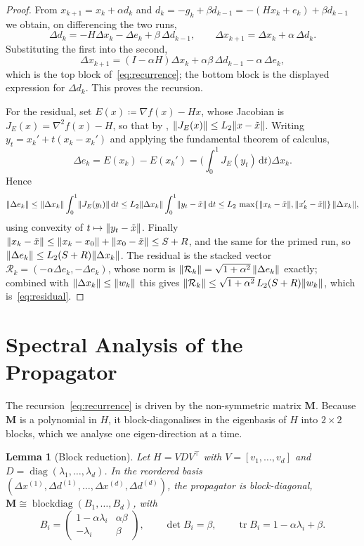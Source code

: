 \documentclass[11pt]{article}
\theoremstyle{plain}
\newtheorem{lemma}{Lemma}[section]
\theoremstyle{definition}
\theoremstyle{remark}
\DeclarePairedDelimiter{\norm}{\lVert}{\rVert}
\renewcommand{\d}{\mathrm{d}}
\DeclareMathOperator{\tr}{tr}
\DeclareMathOperator{\diag}{diag}
\DeclareMathOperator{\blockdiag}{blockdiag}
\newcommand{\grad}{\nabla}
\newcommand{\Hess}{\nabla^2}
\newcommand{\Mmat}{\mathbf{M}}
\newcommand{\xt}{\tilde{x}}
\begin{document}
\begin{proof}
From $x_{k+1}=x_{k}+\alpha d_{k}$ and
$d_{k}=-g_{k}+\beta d_{k-1}=-(Hx_{k}+e_{k})+\beta d_{k-1}$ we obtain, on
differencing the two runs,
\[
  \Delta d_{k}=-H\Delta x_{k}-\Delta e_{k}+\beta\,\Delta d_{k-1},
  \qquad
  \Delta x_{k+1}=\Delta x_{k}+\alpha\,\Delta d_{k}.
\]
Substituting the first into the second,
\[
  \Delta x_{k+1}
  =(I-\alpha H)\Delta x_{k}+\alpha\beta\,\Delta d_{k-1}-\alpha\,\Delta e_{k},
\]
which is the top block of~\eqref{eq:recurrence}; the bottom block is the
displayed expression for $\Delta d_{k}$. This proves the recursion.
 
For the residual, set $E(x)\coloneqq\grad f(x)-Hx$, whose Jacobian is
$J_{E}(x)=\Hess f(x)-H$, so that by ,
$\norm{J_{E}(x)}\le L_{2}\norm{x-\xt}$. Writing
$y_{t}=x_{k}'+t(x_{k}-x_{k}')$ and applying the fundamental theorem of
calculus,
\[
  \Delta e_{k}=E(x_{k})-E(x_{k}')
  =\Big(\int_{0}^{1}J_{E}(y_{t})\,\d t\Big)\Delta x_{k}.
\]
Hence
\[
  \norm{\Delta e_{k}}
  \le\norm{\Delta x_{k}}\int_{0}^{1}\norm{J_{E}(y_{t})}\,\d t
  \le L_{2}\norm{\Delta x_{k}}\int_{0}^{1}\norm{y_{t}-\xt}\,\d t
  \le L_{2}\,\max\{\norm{x_{k}-\xt},\norm{x_{k}'-\xt}\}\,\norm{\Delta x_{k}},
\]
using convexity of $t\mapsto\norm{y_{t}-\xt}$. Finally
$\norm{x_{k}-\xt}\le\norm{x_{k}-x_{0}}+\norm{x_{0}-\xt}\le S+R$, and the
same for the primed run, so
$\norm{\Delta e_{k}}\le L_{2}(S+R)\norm{\Delta x_{k}}$. The residual is
the stacked vector $\mathcal{R}_{k}=(-\alpha\Delta e_{k},-\Delta e_{k})$,
whose norm is $\norm{\mathcal{R}_{k}}=\sqrt{1+\alpha^{2}}\,\norm{\Delta e_{k}}$
exactly; combined with $\norm{\Delta x_{k}}\le\norm{w_{k}}$ this gives
$\norm{\mathcal{R}_{k}}\le\sqrt{1+\alpha^{2}}\,L_{2}(S+R)\norm{w_{k}}$,
which is~\eqref{eq:residual}.
\end{proof}

\section{Spectral Analysis of the Propagator}
\label{sec:spectral}

The recursion~\eqref{eq:recurrence} is driven by the non-symmetric
matrix $\Mmat$. Because $\Mmat$ is a polynomial in $H$, it
block-diagonalises in the eigenbasis of $H$ into $2\times2$ blocks,
which we analyse one eigen-direction at a time.

\begin{lemma}[Block reduction]
\label{lem:block}
Let $H=VD V^{\top}$ with $V=[v_{1},\dots,v_{d}]$ and
$D=\diag(\lambda_{1},\dots,\lambda_{d})$. In the reordered basis
$(\Delta x^{(1)},\Delta d^{(1)},\dots,\Delta x^{(d)},\Delta d^{(d)})$,
the propagator is block-diagonal,
$\Mmat\cong\blockdiag(B_{1},\dots,B_{d})$, with
\begin{equation}\label{eq:blocks}
  B_{i}=\begin{pmatrix}1-\alpha\lambda_{i} & \alpha\beta\\[2pt]-\lambda_{i} & \beta\end{pmatrix},
  \qquad \det B_{i}=\beta,\qquad \tr B_{i}=1-\alpha\lambda_{i}+\beta.
\end{equation}
\end{lemma}
\end{document}
